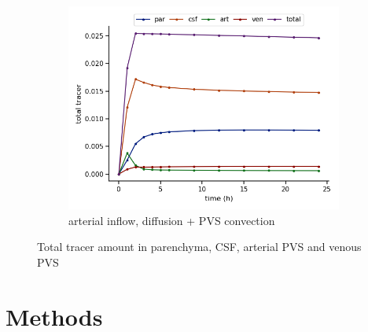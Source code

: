 \documentclass[fleqn,10pt]{wlscirep}
\newcommand{\mer}[1]{\textcolor{magenta}{#1}}
\begin{document}
\begin{figure}
\begin{subfigure}[b]{0.33\textwidth}
         \centering
         \includegraphics[width=\textwidth]{modelC_total_conc.png}
         \caption{arterial inflow, diffusion + PVS convection}
         \label{fig:five over x}
     \end{subfigure}
        \caption{Total tracer amount in parenchyma, CSF, arterial PVS and venous PVS}
        \label{fig:three graphs}
\end{figure}

\fi

\newpage
\section*{Methods}

\end{document}
